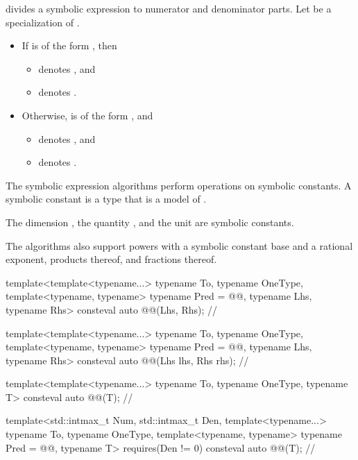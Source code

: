 \pnum
{} divides a symbolic expression to numerator and denominator parts.
Let  be a specialization of .
\begin{itemize}
\item
If  is of the form ,
then
\begin{itemize}
\item
{} denotes , and
\item
{} denotes .
\end{itemize}
\item
Otherwise,  is of the form , and
\begin{itemize}
\item
{} denotes , and
\item
{} denotes .
\end{itemize}
\end{itemize}

\pnum
The symbolic expression algorithms perform operations on symbolic constants.
A symbolic constant is a type that is a model of .
\begin{example}
The dimension , the quantity , and the unit  are symbolic constants.
\end{example}
The algorithms also support
powers with a symbolic constant base and a rational exponent,
products thereof, and
fractions thereof.

\begin{itemdecl}
template<template<typename...> typename To, typename OneType,
         template<typename, typename> typename Pred = @@, typename Lhs, typename Rhs>
consteval auto @@(Lhs, Rhs);        // \expos

template<template<typename...> typename To, typename OneType,
         template<typename, typename> typename Pred = @@, typename Lhs, typename Rhs>
consteval auto @@(Lhs lhs, Rhs rhs);  // \expos

template<template<typename...> typename To, typename OneType, typename T>
consteval auto @@(T);                 // \expos

template<std::intmax_t Num, std::intmax_t Den, template<typename...> typename To,
         typename OneType, template<typename, typename> typename Pred = @@, typename T>
  requires(Den != 0)
consteval auto @@(T);                    // \expos
\end{itemdecl}

